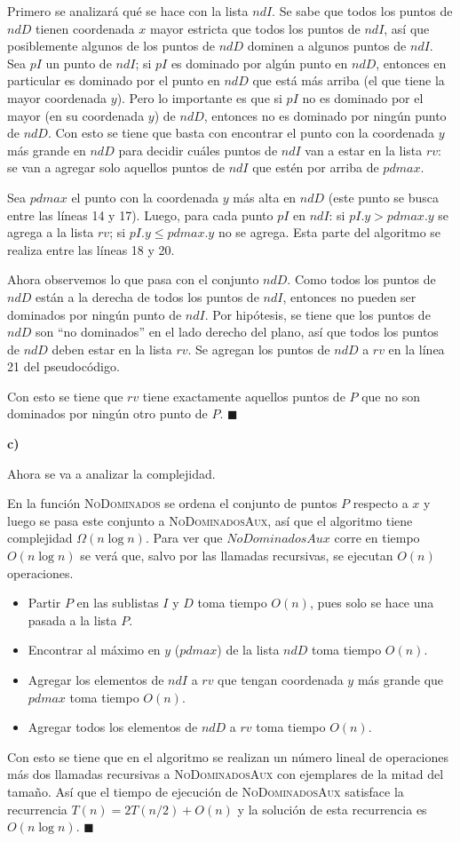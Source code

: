 \documentclass{article}
\begin{document}
Primero se analizará qué se hace con la lista $ndI$. Se sabe que todos los puntos de $ndD$ tienen coordenada $x$ mayor estricta que todos los puntos de $ndI$, así que posiblemente algunos de los puntos de $ndD$ dominen a algunos puntos de $ndI$. Sea $pI$ un punto de $ndI$; si $pI$ es dominado por algún punto en $ndD$, entonces en particular es dominado por el punto en $ndD$ que está más arriba (el que tiene la mayor coordenada $y$). Pero lo importante es que si $pI$ no es dominado por el mayor (en su coordenada $y$) de $ndD$, entonces no es dominado por ningún punto de $ndD$. Con esto se tiene que basta con encontrar el punto con la coordenada $y$ más grande en $ndD$ para decidir cuáles puntos de $ndI$ van a estar en la lista $rv$: se van a agregar solo aquellos puntos de $ndI$ que estén por arriba de $pdmax$.

Sea $pdmax$ el punto con la coordenada $y$ más alta en $ndD$ (este punto se busca entre las líneas 14 y 17). Luego, para cada punto $pI$ en $ndI$: si $pI.y > pdmax.y$ se agrega a la lista $rv$; si $pI.y \leq pdmax.y$ no se agrega. Esta parte del algoritmo se realiza entre las líneas 18 y 20.

Ahora observemos lo que pasa con el conjunto $ndD$. Como todos los puntos de $ndD$ están a la derecha de todos los puntos de $ndI$, entonces no pueden ser dominados por ningún punto de $ndI$. Por hipótesis, se tiene que los puntos de $ndD$ son ``no dominados'' en el lado derecho del plano, así que todos los puntos de $ndD$ deben estar en la lista $rv$. Se agregan los puntos de $ndD$ a $rv$ en la línea 21 del pseudocódigo.

Con esto se tiene que $rv$ tiene exactamente aquellos puntos de $P$ que no son dominados por ningún otro punto de $P$. $\blacksquare$

\textbf{c)}

Ahora se va a analizar la complejidad.

En la función \textsc{NoDominados} se ordena el conjunto de puntos $P$ respecto a $x$ y luego se pasa este conjunto a \textsc{NoDominadosAux}, así que el algoritmo tiene complejidad $\Omega (n \log n)$. Para ver que $NoDominadosAux$ corre en tiempo $O(n \log n)$ se verá que, salvo por las llamadas recursivas, se ejecutan $O(n)$ operaciones.

\begin{itemize}
\item Partir $P$ en las sublistas $I$ y $D$ toma tiempo $O(n)$, pues solo se hace una pasada a la lista $P$.
\item Encontrar al máximo en $y$ ($pdmax$) de la lista $ndD$ toma tiempo $O(n)$.
\item Agregar los elementos de $ndI$ a $rv$ que tengan coordenada $y$ más grande que $pdmax$ toma tiempo $O(n)$.
\item Agregar todos los elementos de $ndD$ a $rv$ toma tiempo $O(n)$.
\end{itemize}

Con esto se tiene que en el algoritmo se realizan un número lineal de operaciones más dos llamadas recursivas a \textsc{NoDominadosAux} con ejemplares de la mitad del tamaño. Así que el tiempo de ejecución de \textsc{NoDominadosAux} satisface la recurrencia $T(n) = 2T(n/2) + O(n)$ y la solución de esta recurrencia es $O(n \log n)$. $\blacksquare$
\end{document}
